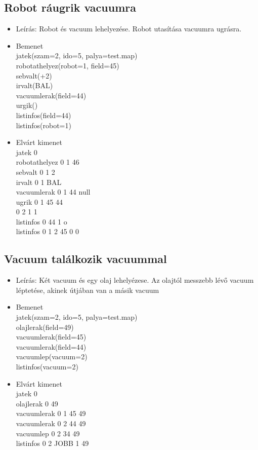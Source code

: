 \subsection{Robot ráugrik vacuumra}
\begin{itemize}
	\item Leírás: Robot és vacuum lehelyezése. Robot utasítása vacuumra ugrásra.
	\item Bemenet\\
		jatek(szam=2, ido=5, palya=test.map) \\
		robotathelyez(robot=1, field=45) \\
		sebvalt(+2) \\
		irvalt(BAL) \\
		vacuumlerak(field=44) \\
		urgik() \\
		listinfos(field=44) \\
		listinfos(robot=1) \\
	\item Elvárt kimenet\\
		jatek 0 \\
		robotathelyez 0 1 46 \\
		sebvalt 0 1 2 \\
		irvalt 0 1 BAL \\		
		vacuumlerak 0 1 44 null\\
		ugrik 0 1 45 44 \\
	   		  0 2 1 1 \\		
		listinfos 0 44 1 o\\
		listinfos 0 1 2 45 0 0 \\
\end{itemize}

\subsection{Vacuum találkozik vacuummal}
\begin{itemize}
	\item Leírás: Két vacuum és egy olaj lehelyézese. Az olajtól messzebb lévő vacuum léptetése, akinek útjában van a másik vacuum
	\item Bemenet\\
		jatek(szam=2, ido=5, palya=test.map) \\
		olajlerak(field=49) \\
		vacuumlerak(field=45) \\
		vacuumlerak(field=44) \\
		vacuumlep(vacuum=2) \\
		listinfos(vacuum=2) \\
	\item Elvárt kimenet\\
		jatek 0 \\
		olajlerak 0 49 \\		
		vacuumlerak 0 1 45 49\\		
		vacuumlerak 0 2 44 49\\
		vacuumlep 0 2 34 49 \\
		listinfos 0 2 JOBB 1 49 \\
\end{itemize}


